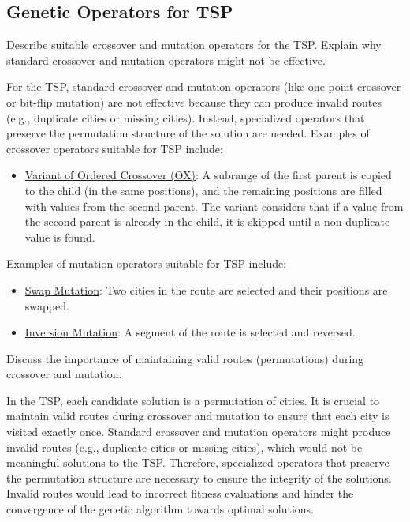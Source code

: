 \subsection*{Genetic Operators for TSP}
\begin{ejercicio}
    Describe suitable crossover and mutation operators for the TSP. Explain why standard crossover and mutation operators might not be effective.
    
    For the TSP, standard crossover and mutation operators (like one-point crossover or bit-flip mutation) are not effective because they can produce invalid routes (e.g., duplicate cities or missing cities). Instead, specialized operators that preserve the permutation structure of the solution are needed. Examples of crossover operators suitable for TSP include:
    \begin{itemize}
        \item \ul{Variant of Ordered Crossover (OX)}: A subrange of the first parent is copied to the child (in the same positions), and the remaining positions are filled with values from the second parent. The variant considers that if a value from the second parent is already in the child, it is skipped until a non-duplicate value is found.
    \end{itemize}
    Examples of mutation operators suitable for TSP include:
    \begin{itemize}
        \item \ul{Swap Mutation}: Two cities in the route are selected and their positions are swapped.
        \item \ul{Inversion Mutation}: A segment of the route is selected and reversed.
    \end{itemize}
\end{ejercicio}
\begin{ejercicio}
    Discuss the importance of maintaining valid routes (permutations) during crossover and mutation.

    In the TSP, each candidate solution is a permutation of cities. It is crucial to maintain valid routes during crossover and mutation to ensure that each city is visited exactly once. Standard crossover and mutation operators might produce invalid routes (e.g., duplicate cities or missing cities), which would not be meaningful solutions to the TSP. Therefore, specialized operators that preserve the permutation structure are necessary to ensure the integrity of the solutions. Invalid routes would lead to incorrect fitness evaluations and hinder the convergence of the genetic algorithm towards optimal solutions.
\end{ejercicio}
